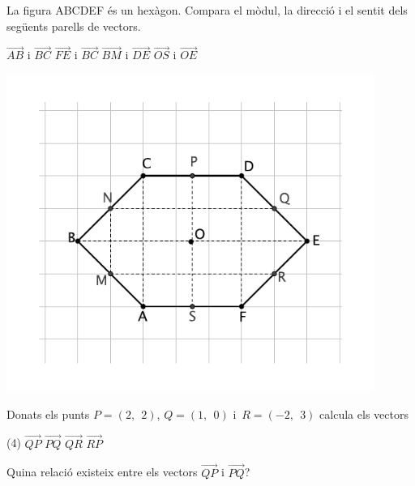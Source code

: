 \begin{mylist}
	
	\exer \mental
		La figura ABCDEF és un hexàgon. Compara el mòdul, la direcció i el sentit dels següents parells de vectors.
		
		\begin{minipage}{0.6\textwidth}
		\begin{tasks} 
			\task $\overrightarrow{AB}$ i	$\overrightarrow{BC}$
			\task $\overrightarrow{FE}$ i	$\overrightarrow{BC}$
			\task $\overrightarrow{BM}$ i	$\overrightarrow{DE}$
			\task $\overrightarrow{OS}$ i	$\overrightarrow{OE}$
		\end{tasks}
	\end{minipage}
	\begin{minipage}{0.34\textwidth} 
		\begin{center}
			\vspace{-0.25cm}
			\includegraphics[width=0.9\textwidth]{img-08/chap-vect-hexagon}
		\end{center}
	\end{minipage}

	
	\exer Donats els punts $P=\left(2,\, \; 2\right)$, $Q=\left(1,\, \; 0\right)$ i $\, R=\left(-2,\, \; 3\right)$ calcula els vectors
	\begin{tasks}(4)
	 \task $\overrightarrow{QP}$    
	 \task $\overrightarrow{PQ}$
	 \task $\overrightarrow{QR}$  
	 \task $\overrightarrow{RP}$
	\end{tasks}
	Quina relació existeix entre els vectors $\overrightarrow{QP}$ i $\overrightarrow{PQ}$?

\answers{[$(1,2)$, $(-1,-2)$, $(-3,3)$, $(4,-1)$]}


\end{mylist}


